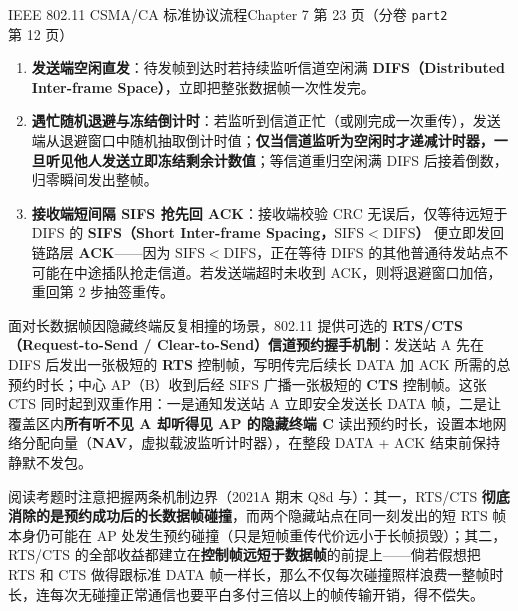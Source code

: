 \begin{StudyBlock}{IEEE 802.11 CSMA/CA 标准协议流程}{Chapter 7 第 23 页（分卷 \texttt{part2} 第 12 页）}
\begin{enumerate}
\item \textbf{发送端空闲直发}：待发帧到达时若持续监听信道空闲满 \textbf{DIFS（Distributed Inter-frame Space）}，立即把整张数据帧一次性发完。
\item \textbf{遇忙随机退避与冻结倒计时}：若监听到信道正忙（或刚完成一次重传），发送端从退避窗口中随机抽取倒计时值；\textbf{仅当信道监听为空闲时才递减计时器，一旦听见他人发送立即冻结剩余计数值}；等信道重归空闲满 DIFS 后接着倒数，归零瞬间发出整帧。
\item \textbf{接收端短间隔 SIFS 抢先回 ACK}：接收端校验 CRC 无误后，仅等待远短于 DIFS 的 \textbf{SIFS（Short Inter-frame Spacing，$\mathrm{SIFS} < \mathrm{DIFS}$）} 便立即发回链路层 \textbf{ACK}——因为 $\mathrm{SIFS} < \mathrm{DIFS}$，正在等待 DIFS 的其他普通待发站点不可能在中途插队抢走信道。若发送端超时未收到 ACK，则将退避窗口加倍，重回第 2 步抽签重传。
\end{enumerate}
\end{StudyBlock}

面对长数据帧因隐藏终端反复相撞的场景，802.11 提供可选的 \textbf{RTS/CTS（Request-to-Send / Clear-to-Send）信道预约握手机制}：发送站 A 先在 DIFS 后发出一张极短的 \textbf{RTS} 控制帧，写明传完后续长 DATA 加 ACK 所需的总预约时长；中心 AP（B）收到后经 SIFS 广播一张极短的 \textbf{CTS} 控制帧。这张 CTS 同时起到双重作用：一是通知发送站 A 立即安全发送长 DATA 帧，二是让覆盖区内\textbf{所有听不见 A 却听得见 AP 的隐藏终端 C} 读出预约时长，设置本地网络分配向量（\textbf{NAV}，虚拟载波监听计时器），在整段 DATA + ACK 结束前保持静默不发包。

阅读考题时注意把握两条机制边界（2021A 期末 Q8d 与）：其一，RTS/CTS \textbf{彻底消除的是预约成功后的长数据帧碰撞}，而两个隐藏站点在同一刻发出的短 RTS 帧本身仍可能在 AP 处发生预约碰撞（只是短帧重传代价远小于长帧损毁）；其二，RTS/CTS 的全部收益都建立在\textbf{控制帧远短于数据帧}的前提上——倘若假想把 RTS 和 CTS 做得跟标准 DATA 帧一样长，那么不仅每次碰撞照样浪费一整帧时长，连每次无碰撞正常通信也要平白多付三倍以上的帧传输开销，得不偿失。



